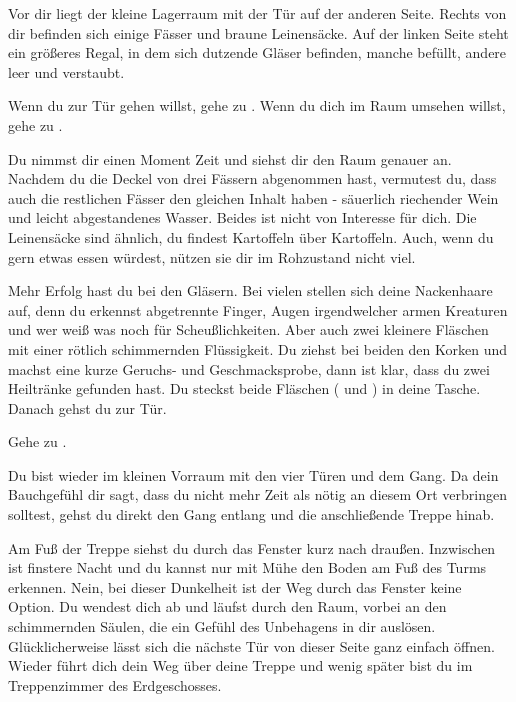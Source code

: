 Vor dir liegt der kleine Lagerraum mit der Tür auf der anderen Seite. Rechts von dir befinden sich einige Fässer und braune Leinensäcke. Auf der linken Seite steht ein größeres Regal, in dem sich dutzende Gläser befinden, manche befüllt, andere leer und verstaubt.

Wenn du zur Tür gehen willst, gehe zu .
Wenn du dich im Raum umsehen willst, gehe zu .


Du nimmst dir einen Moment Zeit und siehst dir den Raum genauer an. Nachdem du die Deckel von drei Fässern abgenommen hast, vermutest du, dass auch die restlichen Fässer den gleichen Inhalt haben - säuerlich riechender Wein und leicht abgestandenes Wasser. Beides ist nicht von Interesse für dich. Die Leinensäcke sind ähnlich, du findest Kartoffeln über Kartoffeln. Auch, wenn du gern etwas essen würdest, nützen sie dir im Rohzustand nicht viel.

Mehr Erfolg hast du bei den Gläsern. Bei vielen stellen sich deine Nackenhaare auf, denn du erkennst abgetrennte Finger, Augen irgendwelcher armen Kreaturen und wer weiß was noch für Scheußlichkeiten. Aber auch zwei kleinere Fläschen mit einer rötlich schimmernden Flüssigkeit. Du ziehst bei beiden den Korken und machst eine kurze Geruchs- und Geschmacksprobe, dann ist klar, dass du zwei Heiltränke gefunden hast. Du steckst beide Fläschen ( und ) in deine Tasche. Danach gehst du zur Tür.

Gehe zu .


Du bist wieder im kleinen Vorraum mit den vier Türen und dem Gang. Da dein Bauchgefühl dir sagt, dass du nicht mehr Zeit als nötig an diesem Ort verbringen solltest, gehst du direkt den Gang entlang und die anschließende Treppe hinab.

Am Fuß der Treppe siehst du durch das Fenster kurz nach draußen. Inzwischen ist finstere Nacht und du kannst nur mit Mühe den Boden am Fuß des Turms erkennen. Nein, bei dieser Dunkelheit ist der Weg durch das Fenster keine Option. Du wendest dich ab und läufst durch den Raum, vorbei an den schimmernden Säulen, die ein Gefühl des Unbehagens in dir auslösen. Glücklicherweise lässt sich die nächste Tür von dieser Seite ganz einfach öffnen. Wieder führt dich dein Weg über deine Treppe und wenig später bist du im Treppenzimmer des Erdgeschosses.

